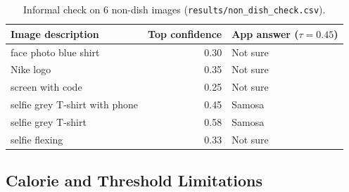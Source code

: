 \begin{table}[H]
  \centering
  \small
  \begin{tabular}{|l|r|l|}
    \hline
    \textbf{Image description} & \textbf{Top confidence} & \textbf{App answer ($\tau = 0.45$)} \\
    \hline
    face photo blue shirt & 0.30 & Not sure \\
    Nike logo & 0.35 & Not sure \\
    screen with code & 0.25 & Not sure \\
    selfie grey T-shirt with phone & 0.45 & Samosa \\
    selfie grey T-shirt & 0.58 & Samosa \\
    selfie flexing & 0.33 & Not sure \\
    \hline
  \end{tabular}
  \caption{Informal check on 6 non-dish images (\texttt{results/non\_dish\_check.csv}).}
  \label{tab:non-dish}
\end{table}

\subsection{Calorie and Threshold Limitations}

